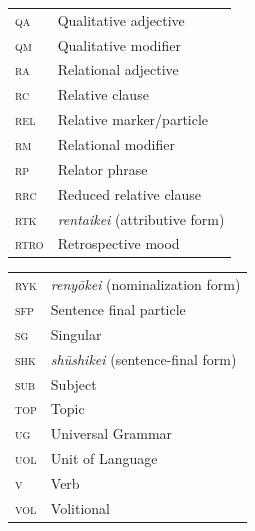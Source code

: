 \begin{tabularx}{.45\textwidth}{@{}lQ}
\textsc{qa} & Qualitative adjective\\
\textsc{qm} & Qualitative modifier\\
\textsc{ra} & Relational adjective\\
\textsc{rc} & Relative clause\\
\textsc{rel} & Relative marker/particle\\
\textsc{rm} & Relational modifier\\
\textsc{rp} & Relator phrase\\
\textsc{rrc} & Reduced relative clause\\
\textsc{rtk} & \textit{rentaikei} (attributive form)\\
\textsc{rtro} & Retrospective mood\\
\end{tabularx}
\begin{tabularx}{.45\textwidth}{@{}ll}
\textsc{ryk} & \textit{renyōkei} (nominalization form)\\
\textsc{sfp} & Sentence final particle\\
\textsc{sg} & Singular\\
\textsc{shk} & \textit{shūshikei} (sentence-final form)\\
\textsc{sub} & Subject\\
\textsc{top} & Topic\\
\textsc{ug} & Universal Grammar\\
\textsc{uol} & Unit of Language\\
\textsc{v} & Verb\\
\textsc{vol} & Volitional\\
\end{tabularx}
